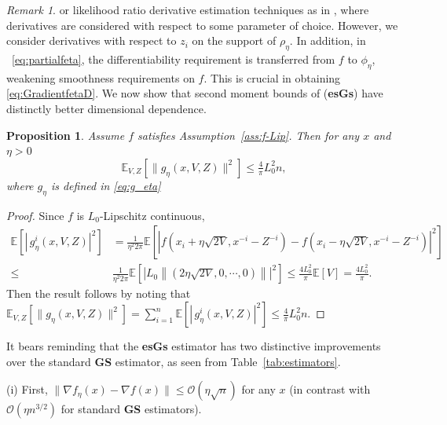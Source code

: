 \documentclass[11pt,reqno]{amsart}
\newcommand{\1}{{\bf 1}}
\newcommand{\2}{{\bf 2}}
\numberwithin{equation}{section}
\newtheorem{proposition}{Proposition}[section]
\theoremstyle{remark}
\newtheorem{remark}{Remark}[section]
\begin{document}
{\begin{remark}
				\citep{FU2006575,jie2022using} or likelihood ratio derivative estimation techniques as in \citep{glynn1989likelihood, glynn1987likelilood}, where 
				derivatives are considered with respect to some parameter of choice. However, 
				we consider derivatives with respect to $z_i$ on the support of
				$\rho_\eta$.  In addition, in
				~\eqref{eq:partialfeta}, the differentiability requirement is transferred from $f$
				to $\phi_\eta$, weakening smoothness requirements on $f$. This is 
				crucial in obtaining \eqref{eq:GradientfetaD}. We now show that second moment bounds of ({\bf esGs}) have distinctly better dimensional dependence.  
			\end{remark}
			\begin{proposition}\label{prop:secmombd-1}
				Assume $f$ satisfies Assumption~\ref{ass:f-Lip}. Then for any $x$ and $\eta > 0$
				\begin{equation}
					\mathbb{E}_{V,Z}[\|{g}_\eta(x,V,Z)\|^2] \leq \tfrac{4}{\pi}L_0^2n,
				\end{equation}
				where $g_{\eta}$ is defined in \eqref{eq:g_eta}
			\end{proposition}
			\begin{proof}
			Since $f$ is $L_0$-Lipschitz continuous, 
			\begin{align*}
				\mathbb{E}\left[\left|\, g_{\eta}^i\left(x,V,Z \right)\right|^2\right]& = \tfrac{1}{\eta^2 2\pi}\mathbb{E}\left[\left | f \left(x_i+\eta\sqrt{2V},x^{-i}-Z^{-i} \right)-f\left(x_i-\eta\sqrt{2V},x^{-i}-Z^{-i}\right)\right|^2\right]\\
				\leq &\tfrac{1}{\eta^2 2\pi}\mathbb{E}\left[\left|L_0\left\|(2\eta\sqrt{2V},0,\cdots,0)\right\|\right|^2 \right]\leq  \tfrac{4L_0^2}{\pi}\mathbb{E}[V]=\tfrac{4L_0^2}{\pi}.
			\end{align*}
			Then the result follows by noting that
			$
			\mathbb{E}_{V,Z}[\|{g}_\eta(x,V,Z)\|^2]  = \sum_{i=1}^n \mathbb{E}\left[\left|\, g_{\eta}^i\left(x,V,Z \right)\right|^2\right] \leq \tfrac{4}{\pi}L_0^2n
			$.
			\end{proof}
			
			It bears reminding that the {\bf esGs} estimator has two distinctive improvements over the standard {\bf GS} estimator, as seen from Table~\ref{tab:estimators}. 
			
			\noindent (i) First, $\|\nabla f_{\eta}(x) - \nabla f(x)\| \le \mathcal{O}\left(\eta \sqrt{n}\right)$ for any $x$ (in contrast with $\mathcal{O}\left(\eta n^{3/2}\right)$ for standard {\bf GS} estimators). 
			
}
\end{document}
